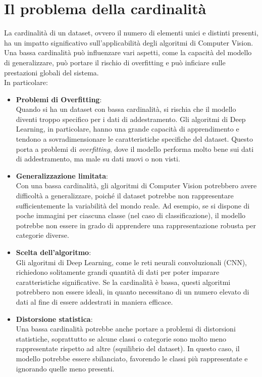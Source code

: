 \documentclass[12pt,a4paper,openright,twoside]{book}
\begin{document}
\section{Il problema della cardinalità}
La cardinalità di un dataset, ovvero il numero di elementi unici e distinti presenti, ha un impatto significativo sull'applicabilità degli algoritmi di Computer Vision. Una bassa cardinalità può influenzare vari aspetti, come la capacità del modello di generalizzare, può portare il rischio di overfitting e può inficiare sulle prestazioni globali del sistema.\\
In particolare: 
\begin{itemize}
\item \textbf{Problemi di Overfitting}:\\
Quando si ha un dataset con bassa cardinalità, si rischia che il modello diventi troppo specifico per i dati di addestramento. Gli algoritmi di Deep Learning, in particolare, hanno una grande capacità di apprendimento e tendono a sovradimensionare le caratteristiche specifiche del dataset. Questo porta a problemi di {\itshape overfitting}, dove il modello performa molto bene sui dati di addestramento, ma male su dati nuovi o non visti.

\item \textbf{Generalizzazione limitata}:\\
Con una bassa cardinalità, gli algoritmi di Computer Vision potrebbero avere difficoltà a generalizzare, poiché il dataset potrebbe non rappresentare sufficientemente la variabilità del mondo reale. Ad esempio, se si dispone di poche immagini per ciascuna classe (nel caso di classificazione), il modello potrebbe non essere in grado di apprendere una rappresentazione robusta per categorie diverse.

\item \textbf{Scelta dell'algoritmo}:\\
Gli algoritmi di Deep Learning, come le reti neurali convoluzionali (CNN), richiedono solitamente grandi quantità di dati per poter imparare caratteristiche significative. Se la cardinalità è bassa, questi algoritmi potrebbero non essere ideali, in quanto necessitano di un numero elevato di dati al fine di essere addestrati in maniera efficace.

\item \textbf{Distorsione statistica}:\\
Una bassa cardinalità potrebbe anche portare a problemi di distorsioni statistiche, soprattutto se alcune classi o categorie sono molto meno rappresentate rispetto ad altre (squilibrio del dataset). In questo caso, il modello potrebbe essere sbilanciato, favorendo le classi più rappresentate e ignorando quelle meno presenti.
\end{itemize}
\end{document}
